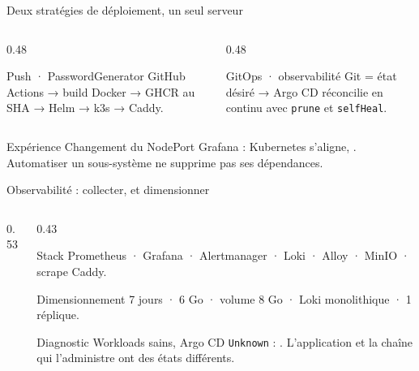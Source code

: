 \begin{frame}{Deux stratégies de déploiement, un seul serveur}
\begin{columns}[T]
\begin{column}{0.48\linewidth}
\begin{block}{Push · PasswordGenerator}
\small GitHub Actions → build Docker → GHCR au SHA → Helm → k3s → Caddy.
\end{block}
\vspace{0.25em}
\centering{}
\end{column}
\begin{column}{0.48\linewidth}
\begin{block}{GitOps · observabilité}
\small Git = état désiré → Argo CD réconcilie en continu avec \texttt{prune} et \texttt{selfHeal}.
\end{block}
\vspace{0.25em}
\centering{}
\end{column}
\end{columns}
\vspace{0.4em}
\begin{block}{Expérience}
\centering\small Changement du NodePort Grafana : Kubernetes s'aligne, . Automatiser un sous-système ne supprime pas ses dépendances.
\end{block}
\end{frame}

\begin{frame}{Observabilité : collecter, et dimensionner}
\begin{columns}[T]
\begin{column}{0.53\linewidth}
\centering{}
\end{column}
\begin{column}{0.43\linewidth}
\begin{block}{Stack}
\small Prometheus · Grafana · Alertmanager · Loki · Alloy · MinIO · scrape Caddy.
\end{block}
\begin{block}{Dimensionnement}
\small 7 jours · 6 Go · volume 8 Go · Loki monolithique · 1 réplique.
\end{block}
\begin{block}{Diagnostic}
\small Workloads sains, Argo CD \texttt{Unknown} : . L'application et la chaîne qui l'administre ont des états différents.
\end{block}
\end{column}
\end{columns}
\end{frame}


